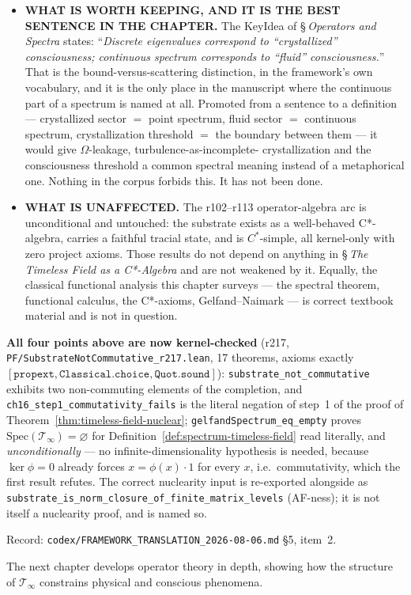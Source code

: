 \begin{itemize}
Simplicity forces $\ker\phi \in \{0,\mathcal{T}_\infty\}$; $\phi\neq 0$ rules out
the second; so $\ker\phi = 0$ and $\mathcal{T}_\infty \cong \C$, contradicting
infinite-dimensionality. Hence the KeyIdea following
Definition~\ref{def:spectrum-timeless-field} --- ``the Riemann zeros are
\emph{special points} in $\mathrm{Spec}(\mathcal{T}_\infty)$'' --- has no
referent on the substrate. This is stronger than a switch between the Gelfand
and operator senses of the word ``spectrum'': on the object the corpus actually
formalizes, the set in question is empty.
\item \textbf{WHAT IS WORTH KEEPING, AND IT IS THE BEST SENTENCE IN THE
CHAPTER.} The KeyIdea of \S\,\emph{Operators and Spectra} states: ``\emph{Discrete
eigenvalues correspond to ``crystallized'' consciousness; continuous spectrum
corresponds to ``fluid'' consciousness.}'' That is the bound-versus-scattering
distinction, in the framework's own vocabulary, and it is the only place in the
manuscript where the continuous part of a spectrum is named at all. Promoted
from a sentence to a definition --- crystallized sector $=$ point spectrum,
fluid sector $=$ continuous spectrum, crystallization threshold $=$ the boundary
between them --- it would give $\Omega$-leakage, turbulence-as-incomplete-
crystallization and the consciousness threshold a common spectral meaning
instead of a metaphorical one. Nothing in the corpus forbids this. It has not
been done.
\item \textbf{WHAT IS UNAFFECTED.} The r102--r113 operator-algebra arc is
unconditional and untouched: the substrate exists as a well-behaved C*-algebra,
carries a faithful tracial state, and is $C^*$-simple, all kernel-only with zero
project axioms. Those results do not depend on anything in
\S\,\emph{The Timeless Field as a C*-Algebra} and are not weakened by it. Equally, the
classical functional analysis this chapter surveys --- the spectral theorem,
functional calculus, the C*-axioms, Gelfand--Naimark --- is correct textbook
material and is not in question.
\end{itemize}

\noindent \textbf{All four points above are now kernel-checked} (r217,
\texttt{PF/SubstrateNotCommutative\_r217.lean}, 17 theorems, axioms exactly
$[\texttt{propext},\texttt{Classical.choice},\texttt{Quot.sound}]$):
\texttt{substrate\_not\_commutative} exhibits two non-commuting elements of the
completion, and \texttt{ch16\_step1\_commutativity\_fails} is the literal
negation of step~1 of the proof of
Theorem~\ref{thm:timeless-field-nuclear};
\texttt{gelfandSpectrum\_eq\_empty} proves
$\mathrm{Spec}(\mathcal{T}_\infty) = \varnothing$ for
Definition~\ref{def:spectrum-timeless-field} read literally, and
\emph{unconditionally} --- no infinite-dimensionality hypothesis is needed,
because $\ker\phi = 0$ already forces $x = \phi(x)\cdot 1$ for every $x$, i.e.\
commutativity, which the first result refutes. The correct nuclearity input is
re-exported alongside as
\texttt{substrate\_is\_norm\_closure\_of\_finite\_matrix\_levels} (AF-ness);
it is not itself a nuclearity proof, and is named so.

\noindent Record: \texttt{codex/FRAMEWORK\_TRANSLATION\_2026-08-06.md} \S5,
item~2.

The next chapter develops operator theory in depth, showing how the structure of $\mathcal{T}_\infty$ constrains physical and conscious phenomena.

